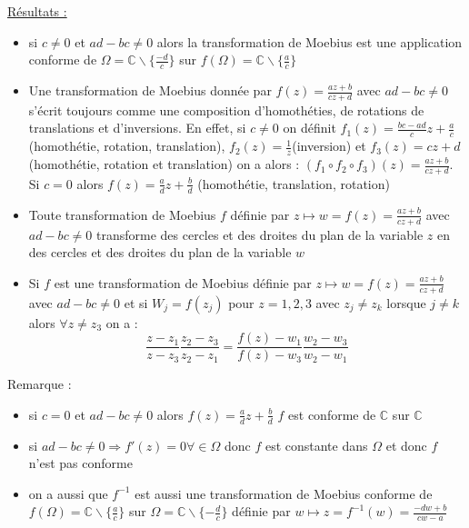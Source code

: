 \documentclass[../main.tex]{subfiles}
\begin{document}
\quad \underline{Résultats :}\\
\begin{itemize}
    \item si $c\neq 0$ et $ad-bc \neq 0$ alors la transformation de Moebius est une application conforme de $\Omega = \mathbb{C} \backslash \{\frac{-d}{c}\}$ sur $f(\Omega) = \mathbb{C} \backslash \{\frac{a}{c}\}$\\
    \item Une transformation de Moebius donnée par $f(z) = \frac{az+b}{cz+d}$ avec $ad-bc \neq 0$ s'écrit toujours comme une composition d'homothéties, de rotations de translations et d'inversions. En effet, si $c\neq 0$ on définit $f_1(z) = \frac{bc-ad}{c}z+ \frac{a}{c}$ (homothétie, rotation, translation), $f_2(z) = \frac{1}{z}$(inversion) et $f_3(z) = cz+d$ (homothétie, rotation et translation) on a alors : $(f_1 \circ f_2 \circ f_3)(z) = \frac{az+b}{cz+d}$. Si $c=0$ alors $f(z) = \frac{a}{d}z+ \frac{b}{d}$ (homothétie, translation, rotation)\\
    \item Toute transformation de Moebius $f$ définie par $z \mapsto w = f(z) = \frac{az+b}{cz+d}$ avec $ad-bc \neq 0$ transforme des cercles et des droites du plan de la variable $z$ en des cercles et des droites du plan de la variable $w$\\
    \item Si $f$ est une transformation de Moebius définie par $z\mapsto w = f(z) = \frac{az+b}{cz+d}$ avec $ad-bc \neq 0$ et si $W_j = f(z_j)$ pour $z=1,2,3$ avec $z_j \neq z_k$ lorsque $j\neq k$ alors $\forall z \neq z_3$ on a : \begin{equation}
        \frac{z-z_1}{z-z_3} \frac{z_2-z_3}{z_2-z_1} = \frac{f(z)-w_1}{f(z)-w_3} \frac{w_2-w_3}{w_2-w_1}
    \end{equation}
\end{itemize}

\color{gray}Remarque : \begin{itemize}
    \item si $c=0$ et $ad-bc\neq 0$ alors $f(z) = \frac{a}{d}z+\frac{b}{d}$ $f$ est conforme de $\mathbb{C}$ sur $\mathbb{C}$\\
    \item si $ad-bc\neq 0 \Rightarrow f'(z) = 0 \forall \in \Omega$ donc $f$ est constante dans $\Omega$ et donc $f$ n'est pas conforme\\
    \item on a aussi que $f^{-1}$ est aussi une transformation de Moebius conforme de $f(\Omega) = \mathbb{C}\backslash \{\frac{a}{c}\}$ sur $\Omega = \mathbb{C} \backslash \{-\frac{d}{c}\}$ définie par $w\mapsto z= f^{-1}(w) = \frac{-dw+b}{cw-a}$\\
\end{itemize}
\color{black}
\end{document}
